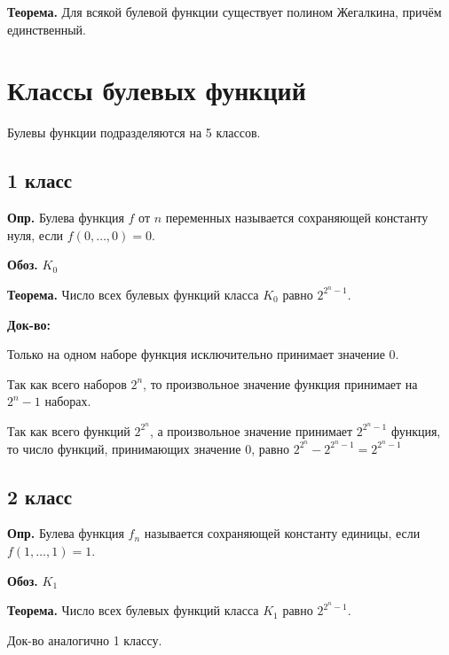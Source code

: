 \documentclass[10pt]{article}
\begin{document}
\par\textbf{Теорема.} Для всякой булевой функции существует полином Жегалкина, причём единственный.

\section*{Классы булевых функций}
\par Булевы функции подразделяются на 5 классов.
\subsection*{1 класс}
\par\textbf{Опр.} Булева функция $f$ от $n$ переменных называется сохраняющей константу нуля, если $f(0, \dots, 0) = 0$.
\par\textbf{Обоз.} $K_0$
\par\textbf{Теорема.} Число всех булевых функций класса $K_0$ равно $2^{2^n-1}$.
\par\textbf{Док-во:}
\par Только на одном наборе функция исключительно принимает значение 0.
\par Так как всего наборов $2^n$, то произвольное значение функция принимает на $2^n-1$ наборах.
\par Так как всего функций $2^{2^n}$, а произвольное значение принимает $2^{2^n-1}$ функция, то число функций, принимающих значение 0, равно $2^{2^n} - 2^{2^n-1} = 2^{2^n-1}$

\subsection*{2 класс}
\par\textbf{Опр.} Булева функция $f_n$ называется сохраняющей константу единицы, если $f(1, \dots, 1) = 1$.
\par\textbf{Обоз.} $K_1$
\par\textbf{Теорема.} Число всех булевых функций класса $K_1$ равно $2^{2^n-1}$.
\par Док-во аналогично 1 классу.
\end{document}
